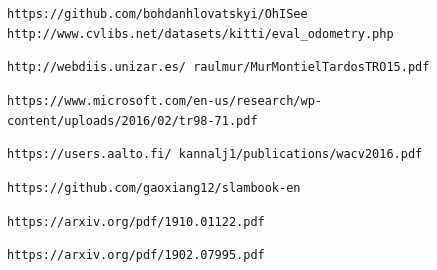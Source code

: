 \begin{thebibliography}{10}

 \texttt{https://github.com/bohdanhlovatskyi/OhISee}
 \texttt{http://www.cvlibs.net/datasets/kitti/eval_odometry.php}

 \texttt{http://webdiis.unizar.es/~raulmur/MurMontielTardosTRO15.pdf}

 \texttt{https://www.microsoft.com/en-us/research/wp-content/uploads/2016/02/tr98-71.pdf} 

 \texttt{https://users.aalto.fi/~kannalj1/publications/wacv2016.pdf}

 \texttt{https://github.com/gaoxiang12/slambook-en}

 \texttt{https://arxiv.org/pdf/1910.01122.pdf}

 \texttt{https://arxiv.org/pdf/1902.07995.pdf}

\end{thebibliography}



